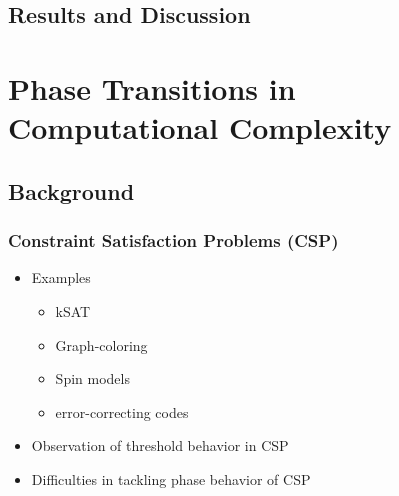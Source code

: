 \documentclass[11pt]{article}
\begin{document}
\subsection{Results and Discussion}
\label{sec-4.4}

\section{Phase Transitions in Computational Complexity}
\label{sec-5}

\subsection{Background}
\label{sec-5.1}

\subsubsection{Constraint Satisfaction Problems (CSP)}
\label{sec-5.1.1}

\begin{itemize}

\item Examples\\
\label{sec-5.1.1.1}

\begin{itemize}

\item kSAT\\
\label{sec-5.1.1.1.1}


\item Graph-coloring\\
\label{sec-5.1.1.1.2}


\item Spin models\\
\label{sec-5.1.1.1.3}


\item error-correcting codes\\
\label{sec-5.1.1.1.4}

\end{itemize} %

\item Observation of threshold behavior in CSP\\
\label{sec-5.1.1.2}


\item Difficulties in tackling phase behavior of CSP\\
\label{sec-5.1.1.3}

\end{itemize} %
\end{document}
